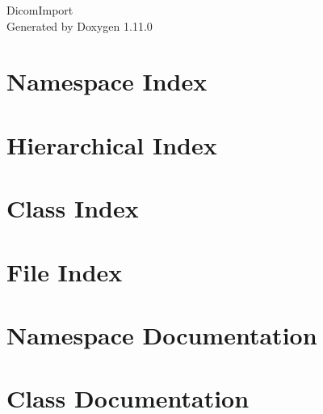 \documentclass[twoside]{book}
\newcommand{\+}{\discretionary{\mbox{\scriptsize$\hookleftarrow$}}{}{}}
\newcommand{\clearemptydoublepage}{%
    \newpage{\pagestyle{empty}\cleardoublepage}%
  }
\begin{document}
  \raggedbottom
    \hypersetup{pageanchor=false,
                bookmarksnumbered=true,
                pdfencoding=unicode
               }
  \begin{titlepage}
  \vspace*{7cm}
  \begin{center}%
  {\Large Dicom\+Import}\\
  \vspace*{1cm}
  {\large Generated by Doxygen 1.11.0}\\
  \end{center}
  \end{titlepage}
  \clearemptydoublepage
  \tableofcontents
  \clearemptydoublepage
  \hypersetup{pageanchor=true}

\chapter{Namespace Index}

\chapter{Hierarchical Index}

\chapter{Class Index}

\chapter{File Index}

\chapter{Namespace Documentation}




\chapter{Class Documentation}






\end{document}
